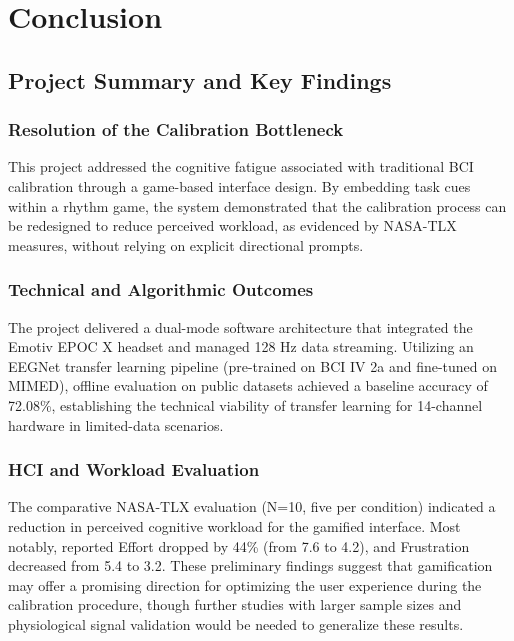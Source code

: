 \documentclass[a4paper, 11pt, openany]{report}
\begin{document}
\chapter{Conclusion}

    \section{Project Summary and Key Findings}

    \subsection{Resolution of the Calibration Bottleneck}
    
    This project addressed the cognitive fatigue associated with traditional BCI calibration through a game-based 
    interface design. By embedding task cues within a rhythm game, the system demonstrated that the calibration 
    process can be redesigned to reduce perceived workload, as evidenced by NASA-TLX measures, without relying 
    on explicit directional prompts.

    \subsection{Technical and Algorithmic Outcomes}
    
    The project delivered a dual-mode software architecture that integrated the Emotiv EPOC X headset and managed 
    128 Hz data streaming. Utilizing an EEGNet transfer learning pipeline (pre-trained on BCI IV 2a and fine-tuned 
    on MIMED), offline evaluation on public datasets achieved a baseline accuracy of 72.08\%, establishing the 
    technical viability of transfer learning for 14-channel hardware in limited-data scenarios.

    \subsection{HCI and Workload Evaluation}
    
    The comparative NASA-TLX evaluation (N=10, five per condition) indicated a reduction in perceived cognitive 
    workload for the gamified interface. Most notably, reported Effort dropped by 44\% (from 7.6 to 4.2), and 
    Frustration decreased from 5.4 to 3.2. These preliminary findings suggest that gamification may offer a 
    promising direction for optimizing the user experience during the calibration procedure, though further 
    studies with larger sample sizes and physiological signal validation would be needed to generalize these results.
\end{document}

